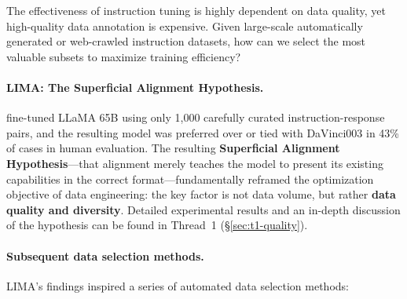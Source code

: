 \begin{problembox}
The effectiveness of instruction tuning is highly dependent on data quality, yet high-quality data annotation is expensive.
Given large-scale automatically generated or web-crawled instruction datasets,
how can we select the most valuable subsets to maximize training efficiency?
\end{problembox}

\paragraph{LIMA: The Superficial Alignment Hypothesis.}
 fine-tuned LLaMA 65B using only 1,000 carefully curated instruction-response pairs,
and the resulting model was preferred over or tied with DaVinci003 in 43\% of cases in human evaluation.
The resulting \textbf{Superficial Alignment Hypothesis}---that alignment merely teaches the model to present its existing capabilities in the correct format---fundamentally reframed the optimization objective of data engineering:
the key factor is not data volume, but rather \textbf{data quality and diversity}.
Detailed experimental results and an in-depth discussion of the hypothesis can be found in Thread~1 (\S\ref{sec:t1-quality}).

\paragraph{Subsequent data selection methods.}
LIMA's findings inspired a series of automated data selection methods:

